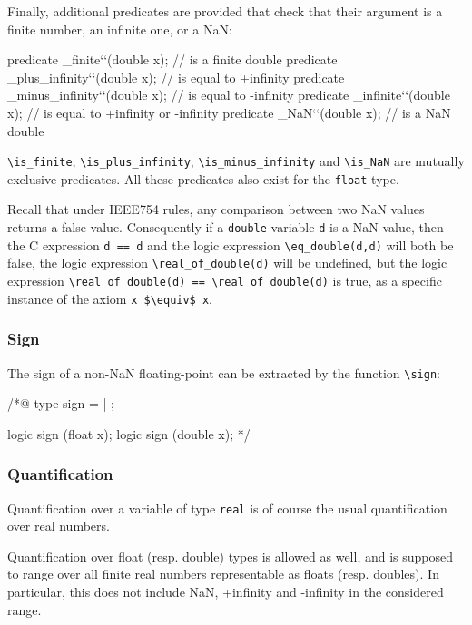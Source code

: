 Finally, additional predicates are provided that check that their argument
is a finite number, an infinite one, or a NaN:
\begin{listing}{1}
predicate \is_finite``(double x); // is a finite double
predicate \is_plus_infinity``(double x); // is equal to +infinity
predicate \is_minus_infinity``(double x); // is equal to -infinity
predicate \is_infinite``(double x); // is equal to +infinity or -infinity
predicate \is_NaN``(double x); // is a NaN double
\end{listing}
\lstinline|\is_finite|, \lstinline|\is_plus_infinity|,
\lstinline|\is_minus_infinity| and \lstinline|\is_NaN| are mutually
exclusive predicates.
All these predicates also exist for the \lstinline|float| type.

Recall that under IEEE754 rules, any comparison between two NaN values returns a false value. 
Consequently if a \lstinline|double| variable \lstinline|d| is a  
NaN value, then the C expression \lstinline|d == d| and the logic expression \lstinline|\eq_double(d,d)| will both be 
false, the logic expression \lstinline|\real_of_double(d)| will be undefined,
but the logic expression 
\lstinline|\real_of_double(d) == \real_of_double(d)| is true, as a specific instance of the axiom \lstinline|x $\equiv$ x|.
\subsubsection{Sign}

The sign of a non-NaN floating-point  can be extracted by
the function \lstinline|\sign|:
\begin{listing}{1}
/*@
 type sign = \Positive | \Negative;

 logic sign \sign(float x);
 logic sign \sign(double x);
*/
\end{listing}


\subsubsection{Quantification}

Quantification over a variable of type \lstinline|real| is of course the usual
quantification over real numbers.

Quantification over float (resp. double) types is allowed as well, and is
supposed to range over all finite real numbers representable as floats (resp.
doubles). In particular, this does not include NaN, +infinity and
-infinity in the considered range.


